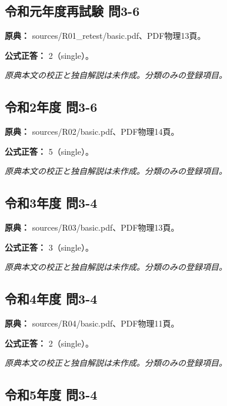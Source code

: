 \subsection{令和元年度再試験 問3-6}
\label{q:r01-ret-basic-3-6}

\noindent\textbf{原典：} sources/R01\_retest/basic.pdf、PDF物理13頁。

\textbf{公式正答：} 2（single）。

\par\textit{原典本文の校正と独自解説は未作成。分類のみの登録項目。}

\subsection{令和2年度 問3-6}
\label{q:r02-reg-basic-3-6}

\noindent\textbf{原典：} sources/R02/basic.pdf、PDF物理14頁。

\textbf{公式正答：} 5（single）。

\par\textit{原典本文の校正と独自解説は未作成。分類のみの登録項目。}

\subsection{令和3年度 問3-4}
\label{q:r03-reg-basic-3-4}

\noindent\textbf{原典：} sources/R03/basic.pdf、PDF物理13頁。

\textbf{公式正答：} 3（single）。

\par\textit{原典本文の校正と独自解説は未作成。分類のみの登録項目。}

\subsection{令和4年度 問3-4}
\label{q:r04-reg-basic-3-4}

\noindent\textbf{原典：} sources/R04/basic.pdf、PDF物理11頁。

\textbf{公式正答：} 2（single）。

\par\textit{原典本文の校正と独自解説は未作成。分類のみの登録項目。}

\subsection{令和5年度 問3-4}
\label{q:r05-reg-basic-3-4}

